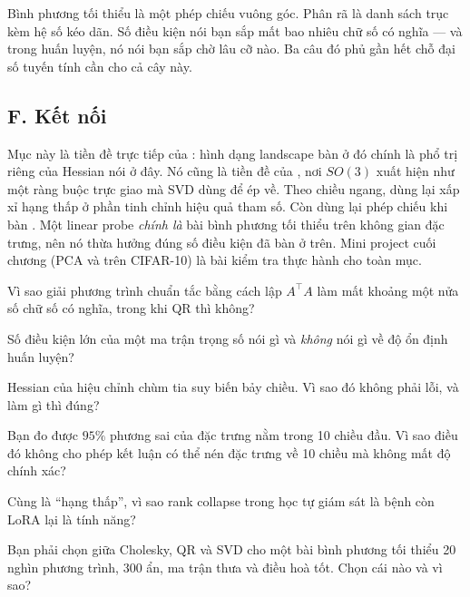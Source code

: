 \documentclass[../../../deep_learning.tex]{subfiles}
\begin{document}
\begin{cannho}
Bình phương tối thiểu là một phép chiếu vuông góc. Phân rã là danh sách trục kèm hệ số kéo dãn. Số điều kiện nói bạn sắp mất bao nhiêu chữ số có nghĩa --- và trong huấn luyện, nó nói bạn sắp chờ lâu cỡ nào. Ba câu đó phủ gần hết chỗ đại số tuyến tính cần cho cả cây này. 
\end{cannho}

\subsection{F. Kết nối}
Mục này là tiền đề trực tiếp của : hình dạng landscape bàn ở đó chính là phổ trị riêng của Hessian nói ở đây. Nó cũng là tiền đề của , nơi \(SO(3)\) xuất hiện như một ràng buộc trực giao mà SVD dùng để ép về. Theo chiều ngang,  dùng lại xấp xỉ hạng thấp ở phần tinh chỉnh hiệu quả tham số. Còn  dùng lại phép chiếu khi bàn . Một linear probe \emph{chính là} bài bình phương tối thiểu trên không gian đặc trưng, nên nó thừa hưởng đúng số điều kiện đã bàn ở trên. Mini project cuối chương (PCA và  trên CIFAR-10) là bài kiểm tra thực hành cho toàn mục.

\begin{tukiem}
\item Vì sao giải phương trình chuẩn tắc bằng cách lập \(A^\top A\) làm mất khoảng một nửa số chữ số có nghĩa, trong khi QR thì không?
\item Số điều kiện lớn của một ma trận trọng số nói gì và \emph{không} nói gì về độ ổn định huấn luyện?
\item Hessian của hiệu chỉnh chùm tia suy biến bảy chiều. Vì sao đó không phải lỗi, và làm gì thì đúng?
\item Bạn đo được \(95\%\) phương sai của đặc trưng nằm trong 10 chiều đầu. Vì sao điều đó không cho phép kết luận có thể nén đặc trưng về 10 chiều mà không mất độ chính xác?
\item Cùng là ``hạng thấp'', vì sao rank collapse trong học tự giám sát là bệnh còn LoRA lại là tính năng?
\item Bạn phải chọn giữa Cholesky, QR và SVD cho một bài bình phương tối thiểu 20 nghìn phương trình, 300 ẩn, ma trận thưa và điều hoà tốt. Chọn cái nào và vì sao?
\end{tukiem}
\ifSubfilesClassLoaded{\printbibliography[title={Nguồn}]}{}
\end{document}

